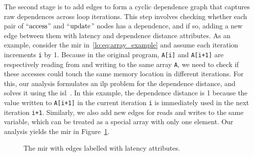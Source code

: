The second stage is to add edges to form a cyclic dependence graph that
captures \gls{raw} dependences across loop iterations.  This step involves
checking whether each pair of ``$\operatorname{\mathrm{access}}$'' and ``$\operatorname{\mathrm{update}}$'' nodes
has a dependence, and if so, adding a new edge between them with latency
and dependence distance attributes.  As an example, consider the \gls{mir}
in~\eqref{lo:eq:array_example} and assume each iteration increments \verb|i|
by 1.  Because in the original program, \verb|A[i]| and \verb|A[i+1]| are
respectively reading from and writing to the same array \verb|A|, we need to
check if these accesses could touch the same memory location in different
iterations.  For this, our analysis formulates an \gls{ilp} problem for
the dependence distance, and solves it using the \gls{isl}~\cite{isl}.
In this example, the dependence distance is 1 because the value written
to \verb|A[i+1]| in the current iteration \verb|i| is immediately used
in the next iteration \verb|i+1|.  Similarly, we also add new edges
for reads and writes to the same variable, which can be treated as a
special array with only one element. Our analysis yields the \gls{mir} in
Figure~\ref{lo:fig:example_latency}.

\begin{figure}[ht]
    \centering
    \caption{%
        The \acrshort{mir} with edges labelled with latency attributes.
    }\label{lo:fig:example_latency}
\end{figure}

